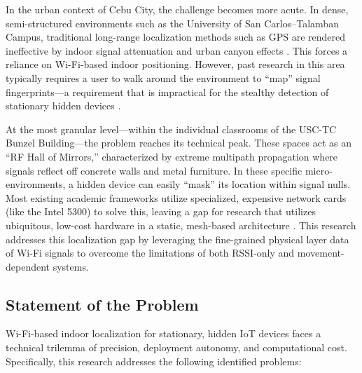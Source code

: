 In the urban context of Cebu City, the challenge becomes more acute. In dense, semi-structured environments such as the University of San Carlos--Talamban Campus, traditional long-range localization methods such as GPS are rendered ineffective by indoor signal attenuation and urban canyon effects \cite{sensors2022indoor3d,xie2015urbancanyon}. This forces a reliance on Wi-Fi-based indoor positioning. However, past research in this area typically requires a user to walk around the environment to ``map'' signal fingerprints---a requirement that is impractical for the stealthy detection of stationary hidden devices \cite{wu2012csi,yang2013rssi2csi}.\smallskip

At the most granular level—within the individual classrooms of the USC-TC Bunzel Building—the problem reaches its technical peak. These spaces act as an ``RF Hall of Mirrors,'' characterized by extreme multipath propagation where signals reflect off concrete walls and metal furniture. In these specific micro-environments, a hidden device can easily ``mask'' its location within signal nulls. Most existing academic frameworks utilize specialized, expensive network cards (like the Intel 5300) to solve this, leaving a gap for research that utilizes ubiquitous, low-cost hardware in a static, mesh-based architecture \cite{yang2013rssi2csi,wu2012csi}. This research addresses this localization gap by leveraging the fine-grained physical layer data of Wi-Fi signals to overcome the limitations of both RSSI-only and movement-dependent systems.\smallskip

\subsection{Statement of the Problem}
Wi-Fi-based indoor localization for stationary, hidden IoT devices faces a technical trilemma of precision, deployment autonomy, and computational cost. Specifically, this research addresses the following identified problems:

